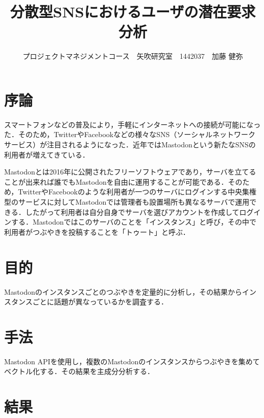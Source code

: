 \documentclass[uplatex,twocolumn,dvipdfmx]{jsarticle}
\title{\vspace{-5mm}\fontsize{14pt}{0pt}\selectfont 分散型SNSにおけるユーザの潜在要求分析}
\author{\normalsize プロジェクトマネジメントコース　矢吹研究室　1442037　加藤 健弥}
\date{}
\begin{document}
\fontsize{10.5pt}{\baselineskip}\selectfont
\maketitle





\section{序論}\label{序論}
スマートフォンなどの普及により，手軽にインターネットへの接続が可能になった．そのため，TwitterやFacebookなどの様々なSNS（ソーシャルネットワークサービス）が注目されるようになった．近年ではMastodonという新たなSNSの利用者が増えてきている．

Mastodonとは2016年に公開されたフリーソフトウェアであり，サーバを立てることが出来れば誰でもMastodonを自由に運用することが可能である．そのため，TwitterやFacebookのような利用者が一つのサーバにログインする中央集権型のサービスに対してMastodonでは管理者も設置場所も異なるサーバで運用できる．したがって利用者は自分自身でサーバを選びアカウントを作成してログインする．Mastodonではこのサーバのことを「インスタンス」と呼び，その中で利用者がつぶやきを投稿することを「トゥート」と呼ぶ\cite{wiki}．


\section{目的}

Mastodonのインスタンスごとのつぶやきを定量的に分析し，その結果からインスタンスごとに話題が異なっているかを調査する．

\section{手法}

Mastodon APIを使用し，複数のMastodonのインスタンスからつぶやきを集めてベクトル化する．その結果を主成分分析する．


\section{結果}
\end{document}
